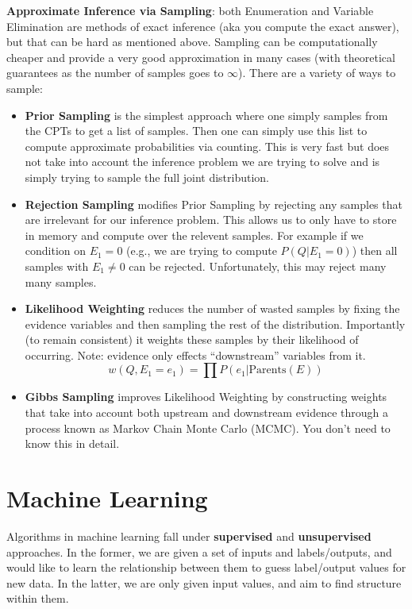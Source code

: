 \documentclass[11pt]{article}
\begin{document}
\textbf{Approximate Inference via Sampling}: both Enumeration and Variable Elimination are methods of exact inference (aka you compute the exact answer), but that can be hard as mentioned above. Sampling can be computationally cheaper and provide a very good approximation in many cases (with theoretical guarantees as the number of samples goes to $\infty$). There are a variety of ways to sample:
\begin{itemize}
    \item \textbf{Prior Sampling} is the simplest approach where one simply samples from the CPTs to get a list of samples. Then one can simply use this list to compute approximate probabilities via counting. This is very fast but does not take into account the inference problem we are trying to solve and is simply trying to sample the full joint distribution.
    \item \textbf{Rejection Sampling} modifies Prior Sampling by rejecting any samples that are irrelevant for our inference problem. This allows us to only have to store in memory and compute over the relevent samples. For example if we condition on $E_1 = 0$ (e.g., we are trying to compute $P(Q|E_1 = 0)$) then all samples with $E_1 \neq 0$ can be rejected. Unfortunately, this may reject many many samples.
    \item \textbf{Likelihood Weighting} reduces the number of wasted samples by fixing the evidence variables and then sampling the rest of the distribution. Importantly (to remain consistent) it weights these samples by their likelihood of occurring. Note: evidence only effects ``downstream'' variables from it.
    $$w(Q,E_1 = e_1) = \prod P(e_1 | \text{Parents}(E)) $$
    \item \textbf{Gibbs Sampling} improves Likelihood Weighting by constructing weights that take into account both upstream and downstream evidence through a process known as Markov Chain Monte Carlo (MCMC). You don't need to know this in detail.
\end{itemize}
\section{Machine Learning}
\noindent Algorithms in machine learning fall under {\bf{supervised}} and {\bf{unsupervised}} approaches. In the former, we are given a set of inputs and labels/outputs, and would like to learn the relationship between them to guess label/output values for new data. In the latter, we are only given input values, and aim to find structure within them.
\end{document}
